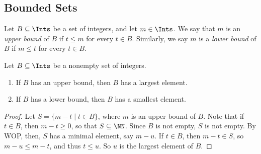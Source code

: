 \documentclass{article}
\begin{document}
\subsection*{Bounded Sets}

\begin{dfn}
Let $B \subseteq \Ints$ be a set of integers, and let $m \in \Ints$. We say that $m$ is an \emph{upper bound} of $B$ if $t \leq m$ for every $t \in B$. Similarly, we say $m$ is a \emph{lower bound} of $B$ if $m \leq t$ for every $t \in B$.
\end{dfn}

\begin{thm}
Let $B \subseteq \Ints$ be a nonempty set of integers.
\begin{enumerate}
\item If $B$ has an upper bound, then $B$ has a largest element.
\item If $B$ has a lower bound, then $B$ has a smallest element.
\end{enumerate}
\end{thm}

\begin{proof}
Let $S = \{ m - t \mid t \in B \}$, where $m$ is an upper bound of $B$. Note that if $t \in B$, then $m - t \geq 0$, so that $S \subseteq \NN$. Since $B$ is not empty, $S$ is not empty. By WOP, then, $S$ has a minimal element, say $m - u$. If $t \in B$, then $m-t \in S$, so $m-u \leq m-t$, and thus $t \leq u$. So $u$ is the largest element of $B$.
\end{proof}
\end{document}
